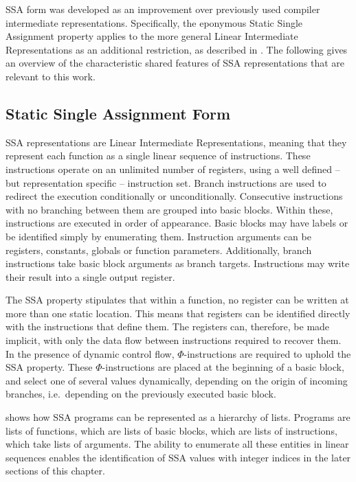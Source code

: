    SSA form was developed as an improvement over previously used
    compiler intermediate representations.
    Specifically, the eponymous Static Single Assignment property applies to the
    more general Linear Intermediate Representations as an additional
    restriction, as described in \citet{Torczon:2007:EC:1526330}.
    The following  gives an overview of the characteristic shared
    features of SSA representations that are relevant to this work.

\subsection{Static Single Assignment Form}
\label{sec:ssaf}

    SSA representations are Linear Intermediate Representations, meaning that
    they represent each function as a single linear sequence of instructions.
    These instructions operate on an unlimited number of registers, using a well
    defined -- but representation specific -- instruction set.
    Branch instructions are used to redirect the execution conditionally or
    unconditionally.
    Consecutive instructions with no branching between them are grouped into
    basic blocks.
    Within these, instructions are executed in order of appearance.
    Basic blocks may have labels or be identified simply by enumerating them.
    Instruction arguments can be registers, constants, globals or function
    parameters.
    Additionally, branch instructions take basic block arguments as branch
    targets.
    Instructions may write their result into a single output register.

    The SSA property stipulates that within a function, no register can be
    written at more than one static location.
    This means that registers can be identified directly with the instructions
    that define them.
    The registers can, therefore, be made implicit, with only the data flow
    between instructions required to recover them.
    In the presence of dynamic control flow, \mbox{$\Phi$-instructions} are
    required to uphold the SSA property.
    These \mbox{$\Phi$-instructions} are placed at the beginning of a basic
    block, and select one of several values dynamically, depending on the origin
    of incoming branches, i.e.\ depending on the previously executed
    basic block.

     shows how SSA programs can be represented as a
    hierarchy of lists.
    Programs are lists of functions, which are lists of basic blocks, which are
    lists of instructions, which take lists of arguments.
    The ability to enumerate all these entities in linear sequences enables the
    identification of SSA values with integer indices in the later sections of
    this chapter.

